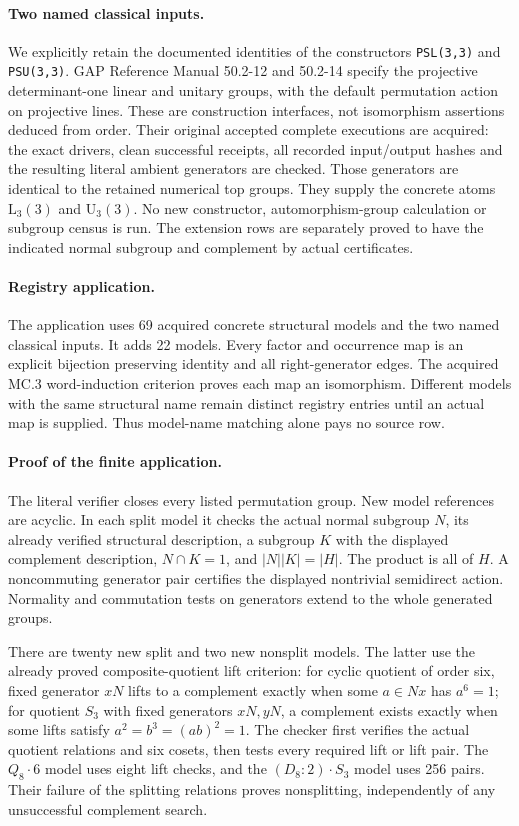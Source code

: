 \documentclass[11pt]{article}
\begin{document}
\paragraph{Two named classical inputs.}
We explicitly retain the documented identities of the constructors
\texttt{PSL(3,3)} and \texttt{PSU(3,3)}. GAP Reference Manual
50.2-12 and 50.2-14 specify the projective determinant-one linear and
unitary groups, with the default permutation action on projective lines.
These are construction interfaces, not isomorphism assertions deduced
from order. Their original accepted complete executions are acquired:
the exact drivers, clean successful receipts, all recorded input/output
hashes and the resulting literal ambient generators are checked.
Those generators are identical to the retained numerical top groups.
They supply the concrete atoms $\mathrm L_3(3)$ and $\mathrm U_3(3)$.
No new constructor, automorphism-group calculation or subgroup census is run.
The extension rows are separately proved to have the indicated normal
subgroup and complement by actual certificates.

\paragraph{Registry application.}
The application uses 69 acquired concrete structural models and the two
named classical inputs. It adds 22 models. Every factor and occurrence map
is an explicit bijection preserving identity and all right-generator edges.
The acquired MC.3 word-induction criterion proves each map an isomorphism.
Different models with the same structural name remain distinct registry
entries until an actual map is supplied. Thus model-name matching alone
pays no source row.

\newpage
\paragraph{Proof of the finite application.}
The literal verifier closes every listed permutation group. New model
references are acyclic. In each split model it checks the actual normal
subgroup $N$, its already verified structural description, a subgroup $K$
with the displayed complement description, $N\cap K=1$, and
$|N||K|=|H|$. The product is all of $H$. A noncommuting generator pair
certifies the displayed nontrivial semidirect action. Normality and
commutation tests on generators extend to the whole generated groups.

There are twenty new split and two new nonsplit models. The latter use
the already proved composite-quotient lift criterion: for cyclic quotient
of order six, fixed generator $xN$ lifts to a complement exactly when
some $a\in Nx$ has $a^6=1$; for quotient $S_3$ with fixed generators
$xN,yN$, a complement exists exactly when some lifts satisfy
$a^2=b^3=(ab)^2=1$. The checker first verifies the actual quotient
relations and six cosets, then tests every required lift or lift pair.
The $Q_8\mathbin{\cdot}6$ model uses eight lift checks, and the
$(D_8:2)\mathbin{\cdot}S_3$ model uses 256 pairs. Their failure of the
splitting relations proves nonsplitting, independently of any unsuccessful
complement search.
\end{document}
